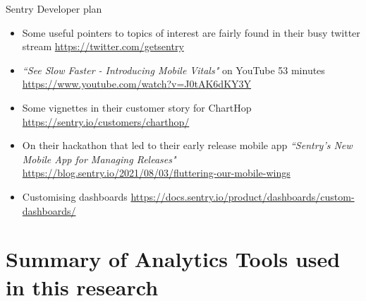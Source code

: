 Sentry Developer plan 

\begin{itemize}
    \item Some useful pointers to topics of interest are fairly found in their busy twitter stream \url{https://twitter.com/getsentry}
    \item \emph{``See Slow Faster - Introducing Mobile Vitals"} on YouTube 53 minutes \url{https://www.youtube.com/watch?v=J0tAK6dKY3Y}
    \item Some vignettes in their customer story for ChartHop \url{https://sentry.io/customers/charthop/}
    \item On their hackathon that led to their early release mobile app \emph{``Sentry's New Mobile App for Managing Releases"}  \url{https://blog.sentry.io/2021/08/03/fluttering-our-mobile-wings}
    \item Customising dashboards \url{https://docs.sentry.io/product/dashboards/custom-dashboards/}
\end{itemize}

\section{Summary of Analytics Tools used in this research}

